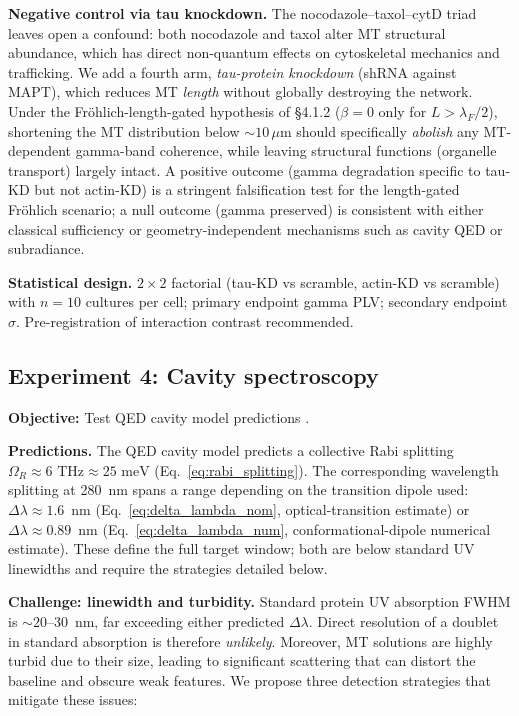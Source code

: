 \documentclass[twocolumn,10pt]{article}
\newcommand{\meV}{\text{~meV}}
\newcommand{\THz}{\text{~THz}}
\begin{document}
\textbf{Negative control via tau knockdown.} The nocodazole--taxol--cytD
triad leaves open a confound: both nocodazole and taxol alter MT
structural abundance, which has direct non-quantum effects on
cytoskeletal mechanics and trafficking. We add a fourth arm, \emph{tau-protein
knockdown} (shRNA against MAPT), which reduces MT \emph{length}
without globally destroying the network. Under the Fr\"ohlich-length-gated
hypothesis of \S 4.1.2 ($\beta=0$ only for $L>\lambda_F/2$), shortening
the MT distribution below $\sim 10\,\mu$m should specifically
\emph{abolish} any MT-dependent gamma-band coherence, while leaving
structural functions (organelle transport) largely intact. A positive
outcome (gamma degradation specific to tau-KD but not actin-KD) is a
stringent falsification test for the length-gated Fr\"ohlich scenario;
a null outcome (gamma preserved) is consistent with either classical
sufficiency or geometry-independent mechanisms such as cavity QED or
subradiance.

\textbf{Statistical design.} $2\times 2$ factorial (tau-KD vs scramble,
actin-KD vs scramble) with $n=10$ cultures per cell; primary endpoint
gamma PLV; secondary endpoint $\sigma$. Pre-registration of interaction
contrast recommended.



\subsection{Experiment 4: Cavity spectroscopy}
\label{sec:exp4}

\textbf{Objective:} Test QED cavity model predictions \cite{Mavromatos2025}.

\textbf{Predictions.} The QED cavity model predicts a collective Rabi
splitting $\Omega_R \approx 6\THz \approx 25\meV$ (Eq.~\ref{eq:rabi_splitting}).
The corresponding wavelength splitting at 280~nm spans a range depending
on the transition dipole used: $\Delta\lambda \approx 1.6$~nm
(Eq.~\ref{eq:delta_lambda_nom}, optical-transition estimate) or
$\Delta\lambda \approx 0.89$~nm (Eq.~\ref{eq:delta_lambda_num},
conformational-dipole numerical estimate). These define the full target
window; both are below standard UV linewidths and require the strategies
detailed below.

\textbf{Challenge: linewidth and turbidity.} Standard protein UV
absorption FWHM is $\sim 20\text{--}30$~nm, far exceeding either predicted
$\Delta\lambda$. Direct resolution of a doublet in standard absorption is
therefore \textit{unlikely}. Moreover, MT solutions are highly turbid due
to their size, leading to significant scattering that can distort the
baseline and obscure weak features. We propose three detection strategies
that mitigate these issues:
\end{document}
